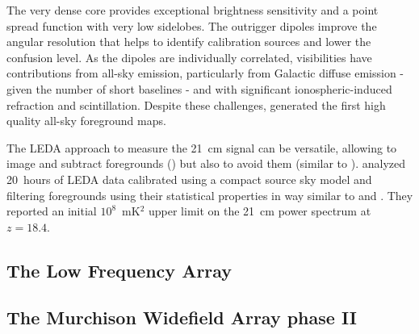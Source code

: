 The very dense core provides exceptional brightness sensitivity and a point spread function with very low sidelobes. The outrigger dipoles improve the angular resolution that helps to identify calibration sources and lower the confusion level. As the dipoles are individually correlated, visibilities have contributions from all-sky emission, particularly from Galactic diffuse emission - given the number of short baselines - and with significant ionospheric-induced refraction and scintillation. Despite these challenges, \cite{eastwood18} generated the first high quality all-sky foreground maps. 

The LEDA approach to measure the 21~cm signal can be versatile, allowing to image and subtract foregrounds (\cite{eastwood18}) but also to avoid them (similar to \cite{beardsley16}). \cite{eastwood19} analyzed 20~hours of LEDA data calibrated using a compact source sky model and filtering foregrounds using their statistical properties in way similar to \cite{dillon14} and \cite{trott16}. They reported an initial $10^8$~mK$^2$ upper limit on the 21~cm power spectrum at $z = 18.4$.



\subsection{The Low Frequency Array}
\label{section:lofar}



\subsection{The Murchison Widefield Array phase II}

